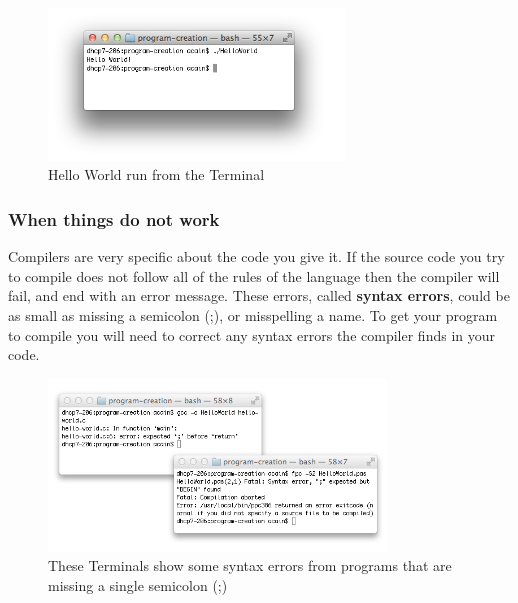 
\begin{figure}[h]
   \centering
   \includegraphics[width=0.7\textwidth]{./topics/programs-and-compilers/images/HelloWorld} 
   \caption[Hello World Terminal]{Hello World run from the Terminal}
   \label{fig:run-helloworld}
\end{figure}


\subsubsection{When things do not work} %
\label{ssub:when_things_do_not_work}

Compilers are very specific about the code you give it. If the source code you try to compile does not follow all of the rules of the language then the compiler will fail, and end with an error message. These errors, called \textbf{syntax errors}, could be as small as missing a semicolon (;), or misspelling a name. To get your program to compile you will need to correct any syntax errors the compiler finds in your code.

\begin{figure}[h]
   \centering
   \includegraphics[width=0.8\textwidth]{./topics/programs-and-compilers/images/SyntaxErrors} 
   \caption{These Terminals show some syntax errors from programs that are missing a single semicolon (;)}
   \label{fig:syntax-errors}
\end{figure}

